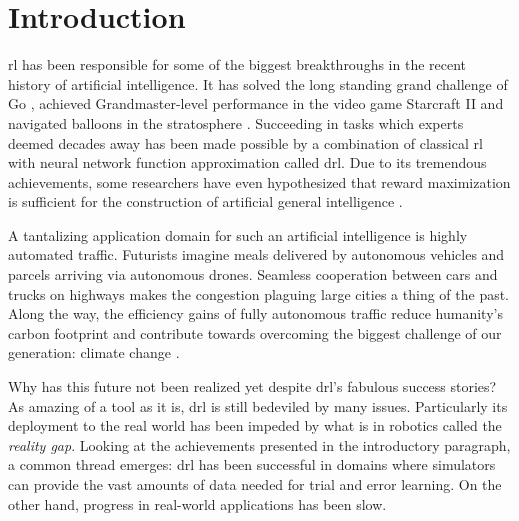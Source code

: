 \glsresetall
\section{Introduction}\label{sec:introduction}
\gls{rl} has been responsible for some of the biggest breakthroughs in the recent history of artificial intelligence. It has solved the long standing grand challenge of Go \cite{silverMasteringGameGo2016}, achieved Grandmaster-level performance in the video game Starcraft II \cite{vinyalsGrandmasterLevelStarCraft2019} and navigated balloons in the stratosphere \cite{bellemareAutonomousNavigationStratospheric2020}. Succeeding in tasks which experts deemed decades away has been made possible by a combination of classical \gls{rl} with neural network function approximation called \gls{drl}. Due to its tremendous achievements, some researchers have even hypothesized that reward maximization is sufficient for the construction of artificial general intelligence \cite{silverRewardEnough2021}.

A tantalizing application domain for such an artificial intelligence is highly automated traffic. Futurists imagine meals delivered by autonomous vehicles and parcels arriving via autonomous drones. Seamless cooperation between cars and trucks on highways makes the congestion plaguing large cities a thing of the past. Along the way, the efficiency gains of fully autonomous traffic reduce humanity's carbon footprint and contribute towards overcoming the biggest challenge of our generation: climate change \cite{rolnickTacklingClimateChange2019}.

Why has this future not been realized yet despite \gls{drl}'s fabulous success stories? As amazing of a tool as it is, \gls{drl} is still bedeviled by many issues. Particularly its deployment to the real world has been impeded by what is in robotics called the \emph{reality gap}. Looking at the achievements presented in the introductory paragraph, a common thread emerges: \gls{drl} has been successful in domains where simulators can provide the vast amounts of data needed for trial and error learning. On the other hand, progress in real-world applications has been slow.

